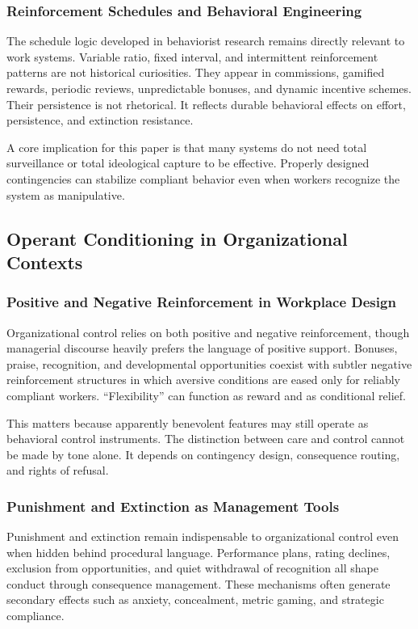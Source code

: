 \documentclass[11pt, a4paper]{article}
\begin{document}
\subsubsection{Reinforcement Schedules and Behavioral Engineering}
The schedule logic developed in behaviorist research remains directly relevant to work systems. Variable ratio, fixed interval, and intermittent reinforcement patterns are not historical curiosities. They appear in commissions, gamified rewards, periodic reviews, unpredictable bonuses, and dynamic incentive schemes. Their persistence is not rhetorical. It reflects durable behavioral effects on effort, persistence, and extinction resistance.

A core implication for this paper is that many systems do not need total surveillance or total ideological capture to be effective. Properly designed contingencies can stabilize compliant behavior even when workers recognize the system as manipulative.

\subsection{Operant Conditioning in Organizational Contexts}

\subsubsection{Positive and Negative Reinforcement in Workplace Design}
Organizational control relies on both positive and negative reinforcement, though managerial discourse heavily prefers the language of positive support. Bonuses, praise, recognition, and developmental opportunities coexist with subtler negative reinforcement structures in which aversive conditions are eased only for reliably compliant workers. ``Flexibility'' can function as reward and as conditional relief.

This matters because apparently benevolent features may still operate as behavioral control instruments. The distinction between care and control cannot be made by tone alone. It depends on contingency design, consequence routing, and rights of refusal.

\subsubsection{Punishment and Extinction as Management Tools}
Punishment and extinction remain indispensable to organizational control even when hidden behind procedural language. Performance plans, rating declines, exclusion from opportunities, and quiet withdrawal of recognition all shape conduct through consequence management. These mechanisms often generate secondary effects such as anxiety, concealment, metric gaming, and strategic compliance.
\end{document}
